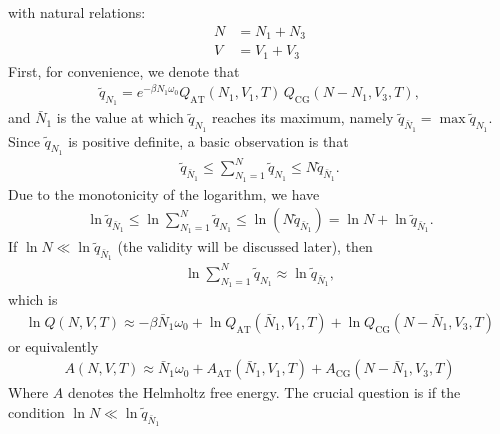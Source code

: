 \documentclass[aip,jcp,a4paper,reprint,onecolumn]{revtex4-1}
\newcommand{\AT}{{\textrm{{AT}}}}
\newcommand{\CG}{{\textrm{CG}}}
\begin{document}
with natural relations:
\begin{align}
  N &= N_1 + N_3\\
  V &= V_1 + V_3
\end{align}
First, for convenience, we denote that
\begin{align}
  \tilde q_{N_1} = 
  e^{-\beta N_1\omega_0}
  Q_{\AT}(N_1, V_1, T)\,
  Q_{\CG}(N - N_1, V_3, T),
\end{align}
and $\bar N_1$ is the value at which $\tilde q_{N_1}$ reaches
its maximum, namely $\tilde q_{\bar N_1} = \max \tilde q_{N_1}$.
Since $\tilde q_{N_1}$ is positive definite, a basic
observation is that
\begin{align}
  \tilde q_{\bar N_1}
  \leq
  \sum_{N_1=1}^N \tilde q_{N_1}
  \leq
  N \tilde q_{\bar N_1}. 
\end{align}
Due to the monotonicity of the logarithm, we have
\begin{align}
  \ln\tilde q_{\bar N_1}
  \leq
  \ln\sum_{N_1=1}^N \tilde q_{N_1}
  \leq
  \ln (N \tilde q_{\bar N_1})
  =
  \ln N + \ln\tilde q_{\bar N_1}.
\end{align}
If $\ln N \ll \ln \tilde q_{\bar N_1}$ (the validity will be discussed
later), then 
\begin{align}
  \ln\sum_{N_1=1}^N \tilde q_{N_1}
  \approx
  \ln\tilde q_{\bar N_1},
\end{align}
which is
\begin{align}
  \ln Q(N, V, T)
  \approx
  -\beta \bar N_1\omega_0 + 
  \ln Q_{\AT}(\bar N_1, V_1, T) + \ln Q_{\CG}(N - \bar N_1, V_3, T)
\end{align}
or equivalently
\begin{align}\label{eqn:a-energy-1}
  A(N, V, T)
  \approx
  \bar N_1\omega_0 +
  A_{\AT}(\bar N_1, V_1, T) + A_{\CG}(N - \bar N_1, V_3, T)
\end{align}
Where $A$ denotes the Helmholtz free energy. 
The crucial question is if the condition $\ln N \ll \ln \tilde q_{\bar N_1}$
\end{document}
